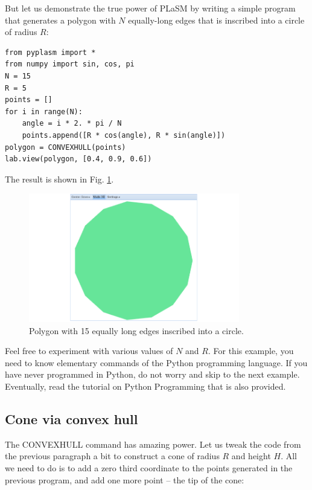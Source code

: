 \documentclass[article,A4,12pt]{llncs}
\begin{document}
But let us 
demonstrate the true power of PLaSM by writing a simple program that generates 
a polygon with $N$ equally-long edges that is inscribed into a circle of radius $R$:

\begin{verbatim}
from pyplasm import *
from numpy import sin, cos, pi
N = 15
R = 5
points = []
for i in range(N):
    angle = i * 2. * pi / N
    points.append([R * cos(angle), R * sin(angle)])
polygon = CONVEXHULL(points)
lab.view(polygon, [0.4, 0.9, 0.6])
\end{verbatim}
The result is shown in Fig. \ref{fig:convexhull-1}.

\begin{figure}[!ht]
\begin{center}
\includegraphics[width=0.82\textwidth]{img/convexhull-1.png}
\end{center}
\vspace{-2mm}
\caption{Polygon with 15 equally long edges inscribed into a circle.}
\label{fig:convexhull-1}
\end{figure}
\noindent
Feel free to experiment with various values of $N$ and $R$.
For this example, you need to know elementary commands of the Python programming 
language. If you have never programmed in Python, do not worry and skip to the next 
example. Eventually, read the tutorial on Python Programming that is also provided.

\subsection{Cone via convex hull}

The CONVEXHULL command has amazing power. Let us tweak the code
from the previous paragraph a bit to construct a cone of radius
$R$ and height $H$. All we need to do is to add a zero third coordinate 
to the points generated in the previous program, and add one more 
point -- the tip of the cone:
\end{document}
